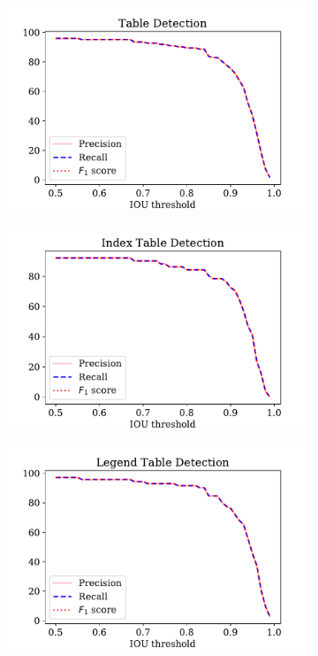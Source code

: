 \begin{figure}[h!]
\centering
\begin{subfigure}{0.325\linewidth}
  \centering
  \includegraphics[width=\linewidth]{table_pRf.pdf}
    \caption{}
    \label{}
\end{subfigure}
\begin{subfigure}{0.325\linewidth}
  \centering
  \includegraphics[width=\linewidth]{index_table_pRf.pdf}
    \caption{}
    \label{}
\end{subfigure}
\begin{subfigure}{0.325\linewidth}
  \centering
  \includegraphics[width=\linewidth]{legend_table_pRf.pdf}

\end{subfigure}
\end{figure}
